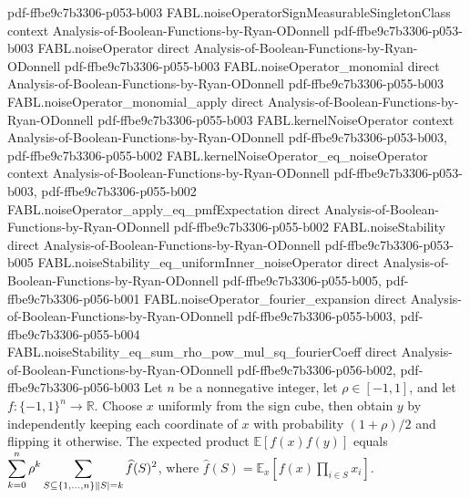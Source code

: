 \begin{theorem}
  {pdf-ffbe9c7b3306-p053-b003}
\proofstep
  {FABL.noiseOperatorSignMeasurableSingletonClass}
  {context}
  {Analysis-of-Boolean-Functions-by-Ryan-ODonnell}
  {pdf-ffbe9c7b3306-p053-b003}
\proofstep
  {FABL.noiseOperator}
  {direct}
  {Analysis-of-Boolean-Functions-by-Ryan-ODonnell}
  {pdf-ffbe9c7b3306-p055-b003}
\proofstep
  {FABL.noiseOperator_monomial}
  {direct}
  {Analysis-of-Boolean-Functions-by-Ryan-ODonnell}
  {pdf-ffbe9c7b3306-p055-b003}
\proofstep
  {FABL.noiseOperator_monomial_apply}
  {direct}
  {Analysis-of-Boolean-Functions-by-Ryan-ODonnell}
  {pdf-ffbe9c7b3306-p055-b003}
\proofstep
  {FABL.kernelNoiseOperator}
  {context}
  {Analysis-of-Boolean-Functions-by-Ryan-ODonnell}
  {pdf-ffbe9c7b3306-p053-b003,
    pdf-ffbe9c7b3306-p055-b002}
\proofstep
  {FABL.kernelNoiseOperator_eq_noiseOperator}
  {context}
  {Analysis-of-Boolean-Functions-by-Ryan-ODonnell}
  {pdf-ffbe9c7b3306-p053-b003,
    pdf-ffbe9c7b3306-p055-b002}
\proofstep
  {FABL.noiseOperator_apply_eq_pmfExpectation}
  {direct}
  {Analysis-of-Boolean-Functions-by-Ryan-ODonnell}
  {pdf-ffbe9c7b3306-p055-b002}
\proofstep
  {FABL.noiseStability}
  {direct}
  {Analysis-of-Boolean-Functions-by-Ryan-ODonnell}
  {pdf-ffbe9c7b3306-p053-b005}
\proofstep
  {FABL.noiseStability_eq_uniformInner_noiseOperator}
  {direct}
  {Analysis-of-Boolean-Functions-by-Ryan-ODonnell}
  {pdf-ffbe9c7b3306-p055-b005,
    pdf-ffbe9c7b3306-p056-b001}
\proofstep
  {FABL.noiseOperator_fourier_expansion}
  {direct}
  {Analysis-of-Boolean-Functions-by-Ryan-ODonnell}
  {pdf-ffbe9c7b3306-p055-b003,
    pdf-ffbe9c7b3306-p055-b004}
\proofstep
  {FABL.noiseStability_eq_sum_rho_pow_mul_sq_fourierCoeff}
  {direct}
  {Analysis-of-Boolean-Functions-by-Ryan-ODonnell}
  {pdf-ffbe9c7b3306-p056-b002,
    pdf-ffbe9c7b3306-p056-b003}
Let $n$ be a nonnegative integer, let $\rho\in[-1,1]$, and let $f:\{-1,1\}^n\to\mathbb
R$. Choose $x$ uniformly from the sign cube, then obtain $y$ by independently keeping
each coordinate of $x$ with probability $(1+\rho)/2$ and flipping it otherwise. The
expected product $\mathbb E[f(x)f(y)]$ equals
$\displaystyle\sum_{k=0}^{n}\rho^k\sum_{\begin{subarray}{c}S\subseteq\{1,\ldots,n\}\|S|=k\end{subarray}}\widehat
f(S)^2$, where $\widehat f(S)=\mathbb E_x\!\left[f(x)\prod_{i\in S}x_i\right]$.
\end{theorem}

